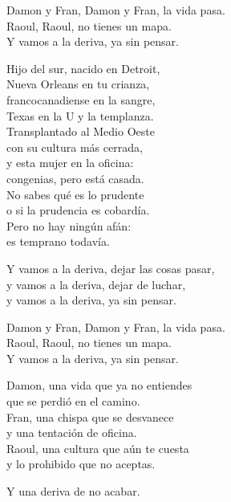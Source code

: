 \begin{lyrics}
Damon y Fran, Damon y Fran, la vida pasa.\\
Raoul, Raoul, no tienes un mapa.\\
Y vamos a la deriva, ya sin pensar.

Hijo del sur, nacido en Detroit,\\
Nueva Orleans en tu crianza,\\
francocanadiense en la sangre,\\
Texas en la U y la templanza.\\
Transplantado al Medio Oeste\\
con su cultura más cerrada,\\
y esta mujer en la oficina:\\
congenias, pero está casada.\\
No sabes qué es lo prudente\\
o si la prudencia es cobardía.\\
Pero no hay ningún afán:\\
es temprano todavía.

Y vamos a la deriva, dejar las cosas pasar,\\
y vamos a la deriva, dejar de luchar,\\
y vamos a la deriva, ya sin pensar.

Damon y Fran, Damon y Fran, la vida pasa.\\
Raoul, Raoul, no tienes un mapa.\\
Y vamos a la deriva, ya sin pensar.

Damon, una vida que ya no entiendes\\
que se perdió en el camino.\\
Fran, una chispa que se desvanece\\
y una tentación de oficina.\\
Raoul, una cultura que aún te cuesta\\
y lo prohibido que no aceptas.

Y una deriva de no acabar.
\end{lyrics}

